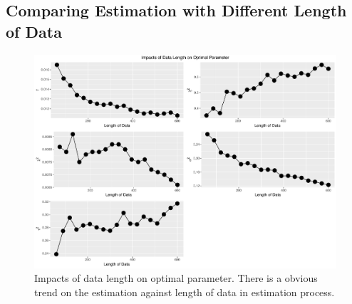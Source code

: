 \clearpage

\subsection*{Comparing Estimation with Different Length of Data }


\begin{figure}[h]
\centering
\includegraphics[width=\textwidth,height=0.5\textheight]{Chapters/05MCMCOU/plots/realdatalengthcompare.pdf}
\caption{Impacts of data length on optimal parameter. There is a obvious trend on the estimation against length of data in estimation process. }
\end{figure}



